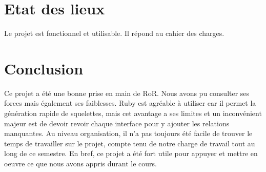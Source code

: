 \documentclass{article}
\begin{document}
\section{Etat des lieux}

Le projet est fonctionnel et utilisable. Il répond au cahier des charges.

\section{Conclusion}

Ce projet a été une bonne prise en main de RoR. Nous avons pu consulter ses forces mais également ses faiblesses. Ruby est agréable à utiliser car il permet la génération rapide de squelettes, mais cet avantage a ses limites et un inconvénient majeur est de devoir revoir chaque interface pour y ajouter les relations manquantes. Au niveau organisation, il n'a pas toujours été facile de trouver le temps de travailler sur le projet, compte tenu de notre charge de travail tout au long de ce semestre. En bref, ce projet a été fort utile pour appuyer et mettre en oeuvre ce que nous avons appris durant le cours.

\printbibliography


\end{document}
